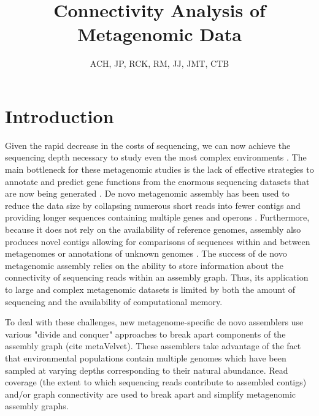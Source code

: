 \documentclass[11pt]{article} %
\begin{document}
\title{Connectivity Analysis of Metagenomic Data}
\author{ACH, JP, RCK, RM, JJ, JMT, CTB}
\maketitle

\section{Introduction}
Given the rapid decrease in the costs of sequencing, we can now achieve the sequencing depth necessary to study even the most complex environments \cite{Hess:2011p686,Qin:2010p189}.  The main bottleneck for these metagenomic studies is the lack of effective strategies to annotate and predict gene functions from the enormous sequencing datasets that are now being generated \cite{Hoff:2009p913,Kunin:2008p16,Noguchi:2006p968,Zhang:2012p959}.  De novo metagenomic assembly has been used to reduce the data size by collapsing numerous short reads into fewer contigs and providing longer sequences containing multiple genes and operons \cite{Miller:2010p226,Pop:2009p798}.  Furthermore, because it does not rely on the availability of reference genomes, assembly also produces novel contigs allowing for comparisons of sequences within and between metagenomes \cite{Li:2009p707,Schloss:2008p2} or annotations of unknown genomes \cite{Hess:2011p686}.  The success of de novo metagenomic assembly relies on the ability to store information about the connectivity of sequencing reads within an assembly graph.  Thus, its application to large and complex metagenomic datasets is limited by both the amount of sequencing and the availability of computational memory. 

To deal with these challenges, new metagenome-specific de novo assemblers use various "divide and conquer" approaches to break apart components of the assembly graph \cite{Peng:2011p898} (cite metaVelvet).  These assemblers take advantage of the fact that environmental populations contain multiple genomes which have been sampled at varying depths corresponding to their natural abundance.  Read coverage (the extent to which sequencing reads contribute to assembled contigs) and/or graph connectivity are used to break apart and simplify metagenomic assembly graphs. 
\end{document}
